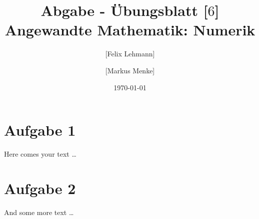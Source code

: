 \documentclass[10pt,a4paper]{article}
\begin{document}
\title{Abgabe - Übungsblatt [$6$]\\
\small{Angewandte Mathematik: Numerik}}
\author{ [Felix Lehmann] \and [Markus Menke]}
\date{\today}
\maketitle

\section*{Aufgabe 1}
Here comes your text \ldots

\section*{Aufgabe 2}
And some more text \ldots
\end{document}
